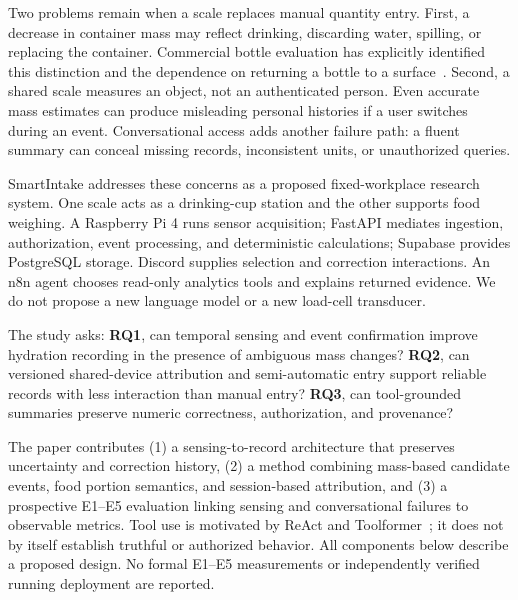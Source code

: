 \documentclass[conference]{IEEEtran}
\newcommand{\sys}{SmartIntake}
\begin{document}
Two problems remain when a scale replaces manual quantity entry. First, a decrease in container mass may reflect drinking, discarding water, spilling, or replacing the container. Commercial bottle evaluation has explicitly identified this distinction and the dependence on returning a bottle to a surface~\cite{cohen2022}. Second, a shared scale measures an object, not an authenticated person. Even accurate mass estimates can produce misleading personal histories if a user switches during an event. Conversational access adds another failure path: a fluent summary can conceal missing records, inconsistent units, or unauthorized queries.

\sys{} addresses these concerns as a proposed fixed-workplace research system. One scale acts as a drinking-cup station and the other supports food weighing. A Raspberry Pi 4 runs sensor acquisition; FastAPI mediates ingestion, authorization, event processing, and deterministic calculations; Supabase provides PostgreSQL storage. Discord supplies selection and correction interactions. An n8n agent chooses read-only analytics tools and explains returned evidence. We do not propose a new language model or a new load-cell transducer.

The study asks: \textbf{RQ1}, can temporal sensing and event confirmation improve hydration recording in the presence of ambiguous mass changes? \textbf{RQ2}, can versioned shared-device attribution and semi-automatic entry support reliable records with less interaction than manual entry? \textbf{RQ3}, can tool-grounded summaries preserve numeric correctness, authorization, and provenance?

The paper contributes (1) a sensing-to-record architecture that preserves uncertainty and correction history, (2) a method combining mass-based candidate events, food portion semantics, and session-based attribution, and (3) a prospective E1--E5 evaluation linking sensing and conversational failures to observable metrics. Tool use is motivated by ReAct and Toolformer~\cite{yao2023react,schick2023}; it does not by itself establish truthful or authorized behavior. All components below describe a proposed design. No formal E1--E5 measurements or independently verified running deployment are reported.
\end{document}
